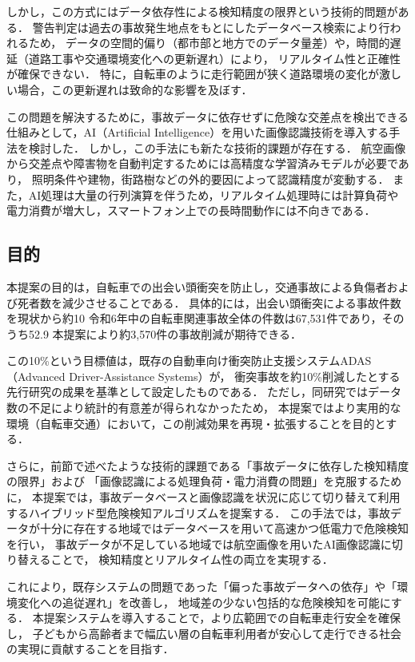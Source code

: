 \documentclass[uplatex,dvipdfmx]{jsarticle}
\begin{document}
しかし，この方式にはデータ依存性による検知精度の限界という技術的問題がある．
警告判定は過去の事故発生地点をもとにしたデータベース検索により行われるため，
データの空間的偏り（都市部と地方でのデータ量差）や，時間的遅延（道路工事や交通環境変化への更新遅れ）により，
リアルタイム性と正確性が確保できない．
特に，自転車のように走行範囲が狭く道路環境の変化が激しい場合，この更新遅れは致命的な影響を及ぼす．

この問題を解決するために，事故データに依存せずに危険な交差点を検出できる仕組みとして，AI（Artificial Intelligence）を用いた画像認識技術を導入する手法を検討した．
しかし，この手法にも新たな技術的課題が存在する．
航空画像から交差点や障害物を自動判定するためには高精度な学習済みモデルが必要であり，
照明条件や建物，街路樹などの外的要因によって認識精度が変動する．
また，AI処理は大量の行列演算を伴うため，リアルタイム処理時には計算負荷や電力消費が増大し，スマートフォン上での長時間動作には不向きである．

\subsection{目的}
本提案の目的は，自転車での出会い頭衝突を防止し，交通事故による負傷者および死者数を減少させることである．
具体的には，出会い頭衝突による事故件数を現状から約10%
令和6年中の自転車関連事故全体の件数は67,531件であり，そのうち52.9%
本提案により約3,570件の事故削減が期待できる．

この10\%という目標値は，既存の自動車向け衝突防止支援システムADAS（Advanced Driver-Assistance Systems）が，
衝突事故を約10\%削減したとする先行研究の成果を基準として設定したものである\cite{ref:adas_purpose}．
ただし，同研究ではデータ数の不足により統計的有意差が得られなかったため，
本提案ではより実用的な環境（自転車交通）において，この削減効果を再現・拡張することを目的とする．

さらに，前節で述べたような技術的課題である「事故データに依存した検知精度の限界」および
「画像認識による処理負荷・電力消費の問題」を克服するために，
本提案では，事故データベースと画像認識を状況に応じて切り替えて利用するハイブリッド型危険検知アルゴリズムを提案する．
この手法では，事故データが十分に存在する地域ではデータベースを用いて高速かつ低電力で危険検知を行い，
事故データが不足している地域では航空画像を用いたAI画像認識に切り替えることで，
検知精度とリアルタイム性の両立を実現する．

これにより，既存システムの問題であった「偏った事故データへの依存」や「環境変化への追従遅れ」を改善し，
地域差の少ない包括的な危険検知を可能にする．
本提案システムを導入することで，より広範囲での自転車走行安全を確保し，
子どもから高齢者まで幅広い層の自転車利用者が安心して走行できる社会の実現に貢献することを目指す．
\end{document}
